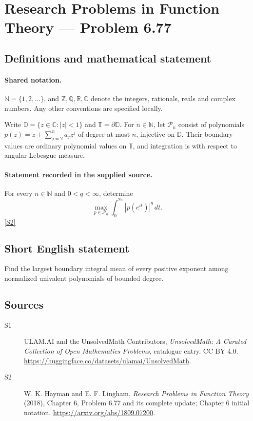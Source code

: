 \documentclass[11pt]{article}
\newcommand{\sref}[2]{\hyperlink{source:#1:#2}{[S#2]}}
\begin{document}
\section{Research Problems in Function Theory — Problem 6.77}\label{statement}

\subsection{Definitions and mathematical statement}

\paragraph{Shared notation.}$\mathbb N=\{1,2,\ldots\}$, and $\mathbb Z,\mathbb Q,\mathbb R,\mathbb C$ denote the integers, rationals, reals and complex numbers. Any other conventions are specified locally.


Write $\mathbb D=\{z\in\mathbb C:|z|<1\}$ and $\mathbb T=\partial\mathbb D$. For $n\in\mathbb N$, let $\mathcal P_n$ consist of polynomials $p(z)=z+\sum_{j=2}^n a_jz^j$ of degree at most $n$, injective on $\mathbb D$. Their boundary values are ordinary polynomial values on $\mathbb T$, and integration is with respect to angular Lebesgue measure.
\paragraph{Statement recorded in the supplied source.}
For every $n\in\mathbb N$ and $0<q<\infty$, determine \[\max_{p\in\mathcal P_n}\int_0^{2\pi}|p(e^{it})|^q\,dt.\] \sref{statement}{2}
\subsection{Short English statement}
Find the largest boundary integral mean of every positive exponent among normalized univalent polynomials of bounded degree.
\subsection{Sources}
\begin{description}
\item[\hypertarget{source:statement:1}{S1}] ULAM.AI and the UnsolvedMath Contributors, \emph{UnsolvedMath: A Curated Collection of Open Mathematics Problems}, catalogue entry. CC BY 4.0. \url{https://huggingface.co/datasets/ulamai/UnsolvedMath}.
\item[\hypertarget{source:statement:2}{S2}] W. K. Hayman and E. F. Lingham, \emph{Research Problems in Function Theory} (2018), Chapter 6, Problem 6.77 and its complete update; Chapter 6 initial notation. \url{https://arxiv.org/abs/1809.07200}.
\end{description}
\label{end:statement}
\end{document}
